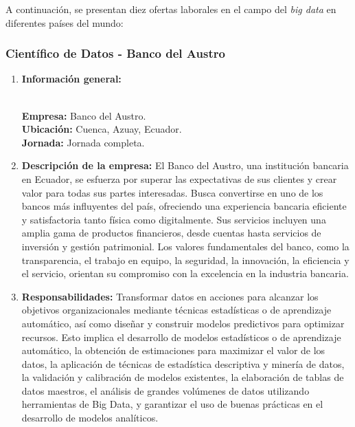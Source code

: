 \documentclass[12pt]{article}
\begin{document}
            A continuación, se presentan diez ofertas laborales en el campo del \emph{big data} en diferentes países del mundo:

            \subsubsection{Científico de Datos - Banco del Austro}

                \begin{enumerate}
                    \item \textbf{Información general:}
                    
                        \textbf{\\Empresa:} Banco del Austro.
                        \textbf{\\Ubicación:} Cuenca, Azuay, Ecuador.
                        \textbf{\\Jornada:} Jornada completa.

                    \item \textbf{Descripción de la empresa:}
                        El Banco del Austro, una institución bancaria en Ecuador, se esfuerza por superar las expectativas de sus clientes y crear valor para todas sus partes interesadas. Busca convertirse en uno de los bancos más influyentes del país, ofreciendo una experiencia bancaria eficiente y satisfactoria tanto física como digitalmente. Sus servicios incluyen una amplia gama de productos financieros, desde cuentas hasta servicios de inversión y gestión patrimonial. Los valores fundamentales del banco, como la transparencia, el trabajo en equipo, la seguridad, la innovación, la eficiencia y el servicio, orientan su compromiso con la excelencia en la industria bancaria.

                    \item \textbf{Responsabilidades:}
                        Transformar datos en acciones para alcanzar los objetivos organizacionales mediante técnicas estadísticas o de aprendizaje automático, así como diseñar y construir modelos predictivos para optimizar recursos. Esto implica el desarrollo de modelos estadísticos o de aprendizaje automático, la obtención de estimaciones para maximizar el valor de los datos, la aplicación de técnicas de estadística descriptiva y minería de datos, la validación y calibración de modelos existentes, la elaboración de tablas de datos maestros, el análisis de grandes volúmenes de datos utilizando herramientas de Big Data, y garantizar el uso de buenas prácticas en el desarrollo de modelos analíticos.


\end{enumerate}
\end{document}
